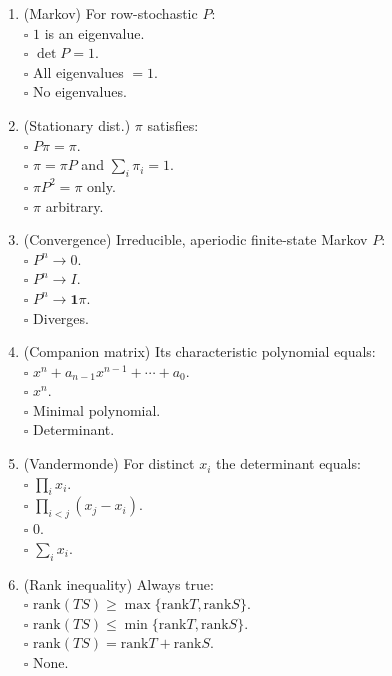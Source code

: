 \documentclass[11pt]{article}
\theoremstyle{upright}
\begin{document}
\begin{enumerate}
\item (Markov) For row-stochastic $P$:\\
\(\square\) $1$ is an eigenvalue.\\
\(\square\) $\det P=1$.\\
\(\square\) All eigenvalues $=1$.\\
\(\square\) No eigenvalues.

\item (Stationary dist.) $\pi$ satisfies:\\
\(\square\) $P\pi=\pi$.\\
\(\square\) $\pi=\pi P$ and $\sum_i\pi_i=1$.\\
\(\square\) $\pi P^2=\pi$ only.\\
\(\square\) $\pi$ arbitrary.

\item (Convergence) Irreducible, aperiodic finite-state Markov $P$:\\
\(\square\) $P^n\to 0$.\\
\(\square\) $P^n\to I$.\\
\(\square\) $P^n\to \mathbf{1}\pi$.\\
\(\square\) Diverges.

\item (Companion matrix) Its characteristic polynomial equals:\\
\(\square\) $x^n+a_{n-1}x^{n-1}+\cdots+a_0$.\\
\(\square\) $x^n$.\\
\(\square\) Minimal polynomial.\\
\(\square\) Determinant.

\item (Vandermonde) For distinct $x_i$ the determinant equals:\\
\(\square\) $\prod_i x_i$.\\
\(\square\) $\prod_{i<j}(x_j-x_i)$.\\
\(\square\) $0$.\\
\(\square\) $\sum_i x_i$.

\item (Rank inequality) Always true:\\
\(\square\) $\mathrm{rank}(TS)\ge \max\{\mathrm{rank} T,\mathrm{rank} S\}$.\\
\(\square\) $\mathrm{rank}(TS)\le \min\{\mathrm{rank} T,\mathrm{rank} S\}$.\\
\(\square\) $\mathrm{rank}(TS)=\mathrm{rank} T+\mathrm{rank} S$.\\
\(\square\) None.


\end{enumerate}
\end{document}
